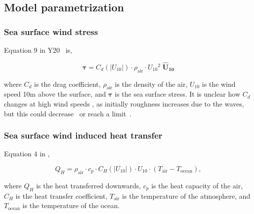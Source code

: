 \subsection{Model parametrization}
\label{sec:param}
\subsubsection{Sea surface wind stress}


Equation 9 in Y20~\cite{ZannaPreprint} is,

\begin{equation}
 \boldsymbol{\tau} = C_d(|U_{10}|)\cdot \rho_{\mathrm{air}} \cdot U_{10}{}^2  \;{}\mathbf{\hat{U}_{10}}
 \label{eq:tau}
 \end{equation}

where $C_d$ is the drag coefficient, $\rho_{\mathrm{air}}$ is the density of the air,
$U_{10}$ is the wind speed 10m above the surface, and $\boldsymbol{\tau}$ is the sea surface stress.
 It is unclear how $C_d$ changes at high wind speeds
 \cite{powell2003reduced}, as initially roughness increases
 due to the waves, but this could decrease~\cite{powell2003reduced}
 or reach a limit~\cite{donelan2004limiting}.


\subsubsection{Sea surface wind induced heat transfer}

% 

Equation 4 in \cite{zou2017observation},

\begin{equation}
Q_{H}=
\rho_{\mathrm{air}} \cdot c_{p} \cdot C_{H}(|U_{10}|) \cdot
U_{10} \cdot \left(T_{\mathrm{air}}
-T_{\mathrm{ocean}}\right),
\end{equation}

where $Q_{H}$ is the heat transferred downwards, $c_p$ is the heat capacity of the air,
$C_{H}$ is the heat transfer coefficient,
$T_{\mathrm{air}}$ is the temperature of the atmosphere, and
$T_{\mathrm{ocean}}$ is the temperature of the ocean.
